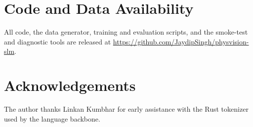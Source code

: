 \documentclass[11pt]{article}
\begin{document}
\section*{Code and Data Availability}
All code, the data generator, training and evaluation scripts, and the
smoke-test and diagnostic tools are released at
\url{https://github.com/JaydipSingh/physvision-slm}.

\section*{Acknowledgements}
The author thanks Linkan Kumbhar for early assistance with the Rust tokenizer
used by the language backbone.



\end{document}
